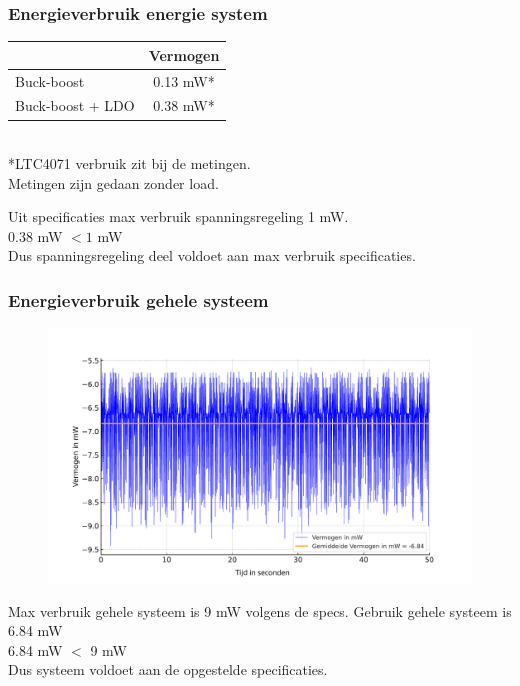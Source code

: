     \begin{frame}
        \frametitle{Energieverbruik energie system}
        \begin{tabular}{|l|c|}
        \hline
            & Vermogen \\ \hline
            Buck-boost & 0.13 mW* \\ \hline
            Buck-boost + LDO  & 0.38 mW*\\ \hline
        \end{tabular} \\       
        *LTC4071 verbruik zit bij de metingen.\\
        Metingen zijn gedaan zonder load.
        \vspace{1cm}

            \centering
            Uit specificaties max verbruik spanningsregeling 1 mW.\\ 
            $0.38$ mW $< 1$ mW\\
            Dus spanningsregeling deel voldoet aan max verbruik specificaties. 

    \end{frame}

    \begin{frame}
        \frametitle{Energieverbruik gehele systeem}
        \begin{figure}[h]
            \centering
            \includegraphics[scale=0.35]{img/vermogensMeting.pdf}
        \end{figure}
        \centering
        Max verbruik gehele systeem is 9 mW volgens de specs.
        Gebruik gehele systeem is 6.84 mW\\
        6.84 mW $<$ 9 mW\\
        Dus systeem voldoet aan de opgestelde specificaties.

    \end{frame}

    
        
    
